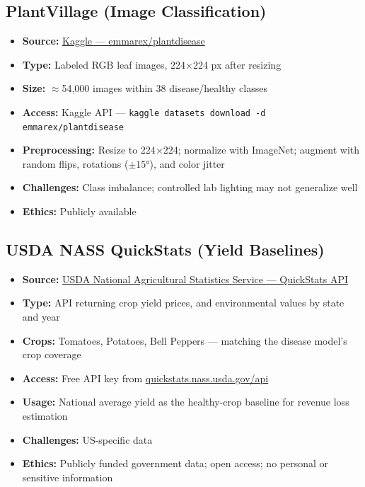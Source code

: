 \documentclass[11pt, letterpaper]{article}
\begin{document}
\subsection{PlantVillage (Image Classification)}
\begin{itemize}
  \item \textbf{Source:} \href{https://www.kaggle.com/datasets/emmarex/plantdisease}{Kaggle — emmarex/plantdisease}
  \item \textbf{Type:} Labeled RGB leaf images, 224$\times$224 px after resizing
  \item \textbf{Size:} $\approx$54,000 images within 38 disease/healthy classes
  \item \textbf{Access:} Kaggle API — \texttt{kaggle datasets download -d emmarex/plantdisease}
  \item \textbf{Preprocessing:} Resize to 224$\times$224; normalize with ImageNet; augment with random flips, rotations ($\pm15°$), and color jitter
  \item \textbf{Challenges:} Class imbalance; controlled lab lighting may not generalize well
  \item \textbf{Ethics:} Publicly available
\end{itemize}

\subsection{USDA NASS QuickStats (Yield Baselines)}
\begin{itemize}
  \item \textbf{Source:} \href{https://quickstats.nass.usda.gov}{USDA National Agricultural Statistics Service — QuickStats API}
  \item \textbf{Type:} API returning crop yield prices, and environmental values by state and year
  \item \textbf{Crops:} Tomatoes, Potatoes, Bell Peppers — matching the disease model's crop coverage
  \item \textbf{Access:} Free API key from \href{https://quickstats.nass.usda.gov/api}{quickstats.nass.usda.gov/api}
  \item \textbf{Usage:} National average yield as the healthy-crop baseline for revenue loss estimation
  \item \textbf{Challenges:} US-specific data
  \item \textbf{Ethics:} Publicly funded government data; open access; no personal or sensitive information
\end{itemize}
\end{document}
